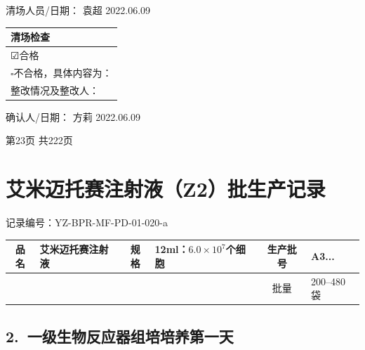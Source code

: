 \documentclass[UTF8,10pt,a4paper,fontset=fandol]{ctexart}
\newcommand{\fieldvalue}[1]{#1}
\newcommand{\handwritten}[1]{#1}
\begin{document}
清场人员/日期：
\fieldvalue{\handwritten{袁超}}
\quad
\fieldvalue{\handwritten{2022.06.09}}

\medskip

\begin{tabularx}{\textwidth}{|X|}
\hline
清场检查 \\
\hline
\fieldvalue{\handwritten{☑}}合格 \\
\hline
$\square$不合格，具体内容为： \\
\hline
整改情况及整改人： \\
\hline
\end{tabularx}

确认人/日期：
\fieldvalue{\handwritten{方莉}}
\quad
\fieldvalue{\handwritten{2022.06.09}}

\vfill

\begin{center}
第23页 共222页
\end{center}

\newpage

\section*{艾米迈托赛注射液（Z2）批生产记录}

记录编号：YZ-BPR-MF-PD-01-020-a

\begin{tabularx}{\textwidth}{|c|X|c|X|c|X|}
\hline
品名 & 艾米迈托赛注射液 & 规格 & 12ml：$6.0\times10^{7}$个细胞 & 生产批号 &
\fieldvalue{\handwritten{A3...}} \\
\hline
\multicolumn{4}{|c|}{} & 批量 & 200--480袋 \\
\hline
\end{tabularx}

\subsection*{2.\ 一级生物反应器组培培养第一天}
\end{document}
